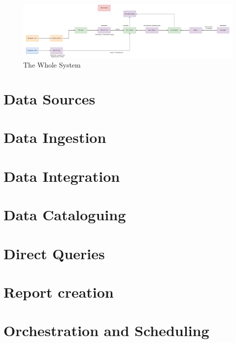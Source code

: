 \begin{figure}[H]
    \centering
    \includegraphics[width=1\textwidth]{res/unox-datalake-v2.pdf}
    \caption{The Whole System}
    \label{fig:wholesystem}
\end{figure}


\section{Data Sources}

\section{Data Ingestion}

\section{Data Integration}

\section{Data Cataloguing}

\section{Direct Queries}

\section{Report creation}

\section{Orchestration and Scheduling}